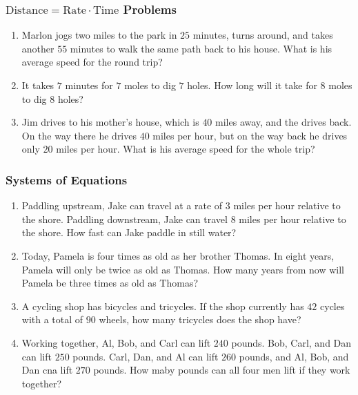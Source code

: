 \documentclass{article}
\begin{document}
    \subsubsection*{$\text{Distance} = \text{Rate} \cdot \text{Time}$ Problems}
    \begin{enumerate}[resume]
        \item Marlon jogs two miles to the park in $25$ minutes, turns around, and takes another $55$ minutes to walk the same path back to his house. What is his average speed for the round trip?
        \vspace{3cm}
        \item It takes $7$ minutes for $7$ moles to dig $7$ holes. How long will it take for $8$ moles to dig $8$ holes?
        \vspace{3cm}
        \item Jim drives to his mother's house, which is $40$ miles away, and the drives back. On the way there he drives $40$ miles per hour, but on the way back he drives only $20$ miles per hour. What is his average speed for the whole trip?
        \vspace{3cm}
    \end{enumerate}
    \subsubsection*{Systems of Equations}
    \begin{enumerate}[resume]
        \item Paddling upstream, Jake can travel at a rate of $3$ miles per hour relative to the shore. Paddling downstream, Jake can travel $8$ miles per hour relative to the shore. How fast can Jake paddle in still water?
        \vspace{3cm}
        \item Today, Pamela is four times as old as her brother Thomas. In eight years, Pamela will only be twice as old as Thomas. How many years from now will Pamela be three times as old as Thomas?
        \vspace{3cm}
        \item A cycling shop has bicycles and tricycles. If the shop currently has $42$ cycles with a total of $90$ wheels, how many tricycles does the shop have?
        \vspace{3cm}
        \item Working together, Al, Bob, and Carl can lift $240$ pounds. Bob, Carl, and Dan can lift $250$ pounds. Carl, Dan, and Al can lift $260$ pounds, and Al, Bob, and Dan cna lift $270$ pounds. How maby pounds can all four men lift if they work together?
        \vspace{3cm}
    \end{enumerate}
\end{document}

